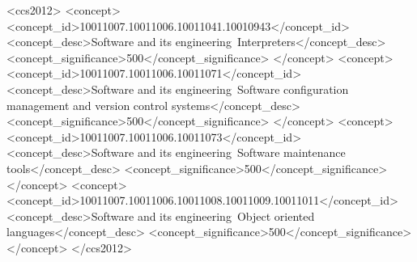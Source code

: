 \documentclass[manuscript,review,screen,nonacm,sigplan]{acmart}
\begin{document}
\begin{CCSXML}
  <ccs2012>
     <concept>
         <concept_id>10011007.10011006.10011041.10010943</concept_id>
         <concept_desc>Software and its engineering~Interpreters</concept_desc>
         <concept_significance>500</concept_significance>
         </concept>
     <concept>
         <concept_id>10011007.10011006.10011071</concept_id>
         <concept_desc>Software and its engineering~Software configuration management and version control systems</concept_desc>
         <concept_significance>500</concept_significance>
         </concept>
     <concept>
         <concept_id>10011007.10011006.10011073</concept_id>
         <concept_desc>Software and its engineering~Software maintenance tools</concept_desc>
         <concept_significance>500</concept_significance>
         </concept>
     <concept>
         <concept_id>10011007.10011006.10011008.10011009.10011011</concept_id>
         <concept_desc>Software and its engineering~Object oriented languages</concept_desc>
         <concept_significance>500</concept_significance>
         </concept>
   </ccs2012>
\end{CCSXML}
  


\end{document}
